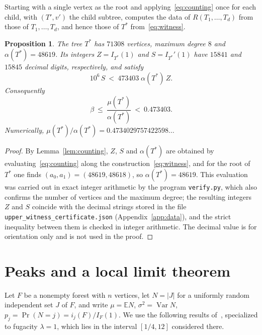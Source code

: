 \documentclass{amsart}
\numberwithin{equation}{section}
\theoremstyle{plain}
\newtheorem{proposition}[theorem]{Proposition}
\theoremstyle{definition}
\theoremstyle{remark}
\DeclareMathOperator{\Var}{Var}
\newcommand{\E}{\mathbb{E}}
\begin{document}
Starting with a single vertex as the root and applying~\eqref{eq:counting} once for each child, with $(T',v')$ the child subtree, computes the data of $R(T_1,\dots,T_d)$ from those of $T_1,\dots,T_d$, and hence those of $T^*$ from~\eqref{eq:witness}.

\begin{proposition}\label{prop:witness}
The tree $T^*$ has $71308$ vertices, maximum degree $8$ and $\alpha(T^*)=48619$. Its integers $Z=I_{T^*}(1)$ and $S=I_{T^*}'(1)$ have $15841$ and $15845$ decimal digits, respectively, and satisfy
\[
10^6\,S\ <\ 473403\;\alpha(T^*)\,Z .
\]
Consequently
\[
\beta\ \le\ \frac{\mu(T^*)}{\alpha(T^*)}\ <\ 0.473403 .
\]
Numerically, $\mu(T^*)/\alpha(T^*)=0.4734029757422598\dots$
\end{proposition}

\begin{proof}
By Lemma~\ref{lem:counting}, $Z$, $S$ and $\alpha(T^*)$ are obtained by evaluating~\eqref{eq:counting} along the construction~\eqref{eq:witness}, and for the root of $T^*$ one finds $(a_0,a_1)=(48619,48618)$, so $\alpha(T^*)=48619$. This evaluation was carried out in exact integer arithmetic by the program \texttt{verify.py}, which also confirms the number of vertices and the maximum degree; the resulting integers $Z$ and $S$ coincide with the decimal strings stored in the file \texttt{upper\_witness\_certificate.json} (Appendix~\ref{app:data}), and the strict inequality between them is checked in integer arithmetic. The decimal value is for orientation only and is not used in the proof.
\end{proof}

\section{Peaks and a local limit theorem}\label{sec:peaks}

Let $F$ be a nonempty forest with $n$ vertices, let $N=|J|$ for a uniformly random independent set $J$ of $F$, and write $\mu=\E N$, $\sigma^2=\Var N$, $p_j=\Pr(N=j)=i_j(F)/I_F(1)$. We use the following results of~\cite{FLNYZ}, specialized to fugacity $\lambda=1$, which lies in the interval $[1/4,12]$ considered there.
\end{document}
